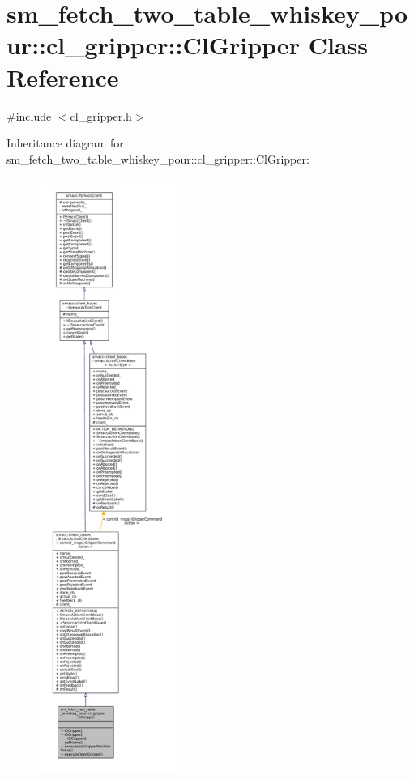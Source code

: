 \hypertarget{classsm__fetch__two__table__whiskey__pour_1_1cl__gripper_1_1ClGripper}{}\section{sm\+\_\+fetch\+\_\+two\+\_\+table\+\_\+whiskey\+\_\+pour\+:\+:cl\+\_\+gripper\+:\+:Cl\+Gripper Class Reference}
\label{classsm__fetch__two__table__whiskey__pour_1_1cl__gripper_1_1ClGripper}


{\ttfamily \#include $<$cl\+\_\+gripper.\+h$>$}



Inheritance diagram for sm\+\_\+fetch\+\_\+two\+\_\+table\+\_\+whiskey\+\_\+pour\+:\+:cl\+\_\+gripper\+:\+:Cl\+Gripper\+:
\nopagebreak
\begin{figure}[H]
\begin{center}
\leavevmode
\includegraphics[height=550pt]{classsm__fetch__two__table__whiskey__pour_1_1cl__gripper_1_1ClGripper__inherit__graph}
\end{center}
\end{figure}


